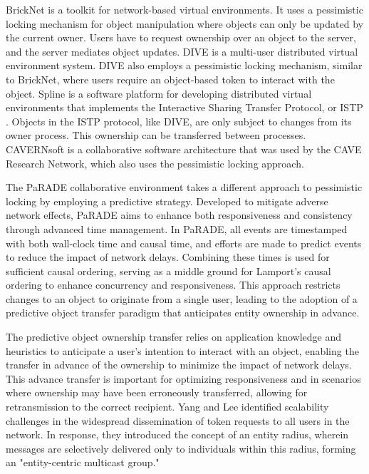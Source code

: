     BrickNet \cite{singhBrickNetSoftwareToolkit1994a} is a toolkit for network-based virtual environments. It uses a pessimistic locking mechanism for object manipulation where objects can only be updated by the current owner. Users have to request ownership over an object to the server, and the server mediates object updates. DIVE \cite{hagsandInteractiveMultiuserVEs1996} is a multi-user distributed virtual environment system. DIVE also employs a pessimistic locking mechanism, similar to BrickNet, where users require an object-based token to interact with the object. Spline \cite{watersDiamondParkSpline1997} is a software platform for developing distributed virtual environments that implements the Interactive Sharing Transfer Protocol, or ISTP \cite{watersDesignInteractiveSharing1997}. Objects in the ISTP protocol, like DIVE, are only subject to changes from its owner process. This ownership can be transferred between processes. CAVERNsoft \cite{leighCAVERNDistributedArchitecture1997} is a collaborative software architecture that was used by the CAVE Research Network, which also uses the pessimistic locking approach.

    The PaRADE collaborative environment \cite{robertsMaximisingConcurrencyScalability1997, robertsControllingConsistencyCollaborative2004} takes a different approach to pessimistic locking by employing a predictive strategy. Developed to mitigate adverse network effects, PaRADE aims to enhance both responsiveness and consistency through advanced time management. In PaRADE, all events are timestamped with both wall-clock time and causal time, and efforts are made to predict events to reduce the impact of network delays. Combining these times is used for sufficient causal ordering, serving as a middle ground for Lamport's causal ordering \cite{lamportTimeClocksOrdering1978} to enhance concurrency and responsiveness. This approach restricts changes to an object to originate from a single user, leading to the adoption of a predictive object transfer paradigm that anticipates entity ownership in advance.

    The predictive object ownership transfer relies on application knowledge and heuristics to anticipate a user's intention to interact with an object, enabling the transfer in advance of the ownership to minimize the impact of network delays. This advance transfer is important for optimizing responsiveness and in scenarios where ownership may have been erroneously transferred, allowing for retransmission to the correct recipient. Yang and Lee \cite{yangScalablePredictionBased2000} identified scalability challenges in the widespread dissemination of token requests to all users in the network. In response, they introduced the concept of an entity radius, wherein messages are selectively delivered only to individuals within this radius, forming an "entity-centric multicast group."
    
